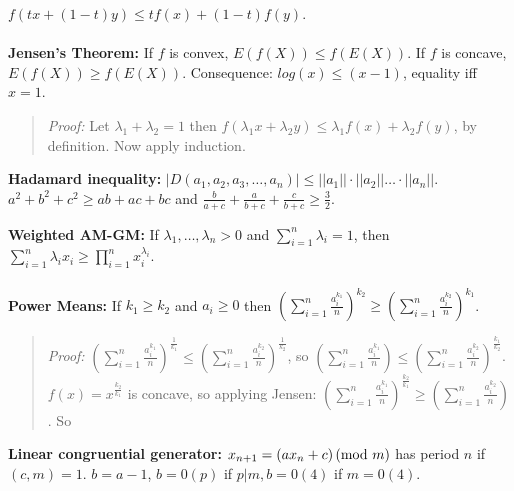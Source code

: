 $f( tx+(1-t)y) \leq tf(x)+(1-t)f(y)$.
\\
\\
{\bf Jensen's Theorem:} If $f$ is convex, $E(f(X)) \leq f(E(X))$.
If $f$ is concave, $E(f(X)) \geq f(E(X))$.
Consequence:
$log(x) \leq (x-1)$, equality iff $x=1$.
\begin{quote}
\emph{Proof:} Let $\lambda_1 + \lambda_2 = 1$ then $f(\lambda_1 x + \lambda_2 y) \leq
\lambda_1 f(x) + \lambda_2 f(y)$, by definition. Now apply induction.
\end{quote}
{\bf Hadamard inequality:}
$|D(a_1 , a_2 , a_3 , \ldots , a_n )| \leq ||a_1 || \cdot ||a_2 || \ldots
\cdot ||a_n ||$.
$a^2 + b^2 + c^2 \geq ab + ac + bc$ and
${\frac {b} {a+c}} + {\frac {a} {b+c}} + {\frac {c} {b+c}} \geq {\frac {3}
{2}}$.
\begin{quote}
\end{quote}
{\bf Weighted AM-GM:}  If
$\lambda_1, \ldots , \lambda_n >0$ and
$\sum_{i=1}^n \lambda_i= 1$, then
$\sum_{i=1}^n \lambda_i x_i \geq \prod_{i=1}^n x_i^{\lambda_i}$.
\\
\\
{\bf Power Means:}  If $k_1 \geq k_2$ and $a_i \geq 0$ then 
$ (\sum_{i=1}^n {\frac {a_i^{k_1}} {n}})^{k_2} \geq (\sum_{i=1}^n {\frac {a_i^{k_2}} {n}})^{k_1} $.
\begin{quote}
\emph{Proof:}
$(\sum_{i=1}^n {\frac {a_i^{k_1}} n})^{\frac 1 {k_1}} \leq (\sum_{i=1}^n {\frac {a_i^{k_2}} n})^{\frac 1 {k_2}}$,
so $(\sum_{i=1}^n {\frac {a_i^{k_1}} n})\leq (\sum_{i=1}^n {\frac {a_i^{k_2}} n})^{\frac {k_1} {k_2}}$.
$f(x) = x^{\frac {k_2} {k_1}}$ is concave, so applying Jensen:
$(\sum_{i=1}^n {\frac {a_i^{k_1}} n})^{\frac {k_2} {k_1}} \geq (\sum_{i=1}^n {\frac {a_i^{k_2}} n})$. So
\end{quote}
{\bf Linear congruential generator:}
$x_{n+1} = (a x_{n} + c) \thinspace \textnormal{(mod } m \textnormal{)}$
has period $n$ if $(c,m)=1$.  $b=a-1$, $b=0 (p)$ if $p|m, b=0 (4)$
if $m=0 (4)$.
